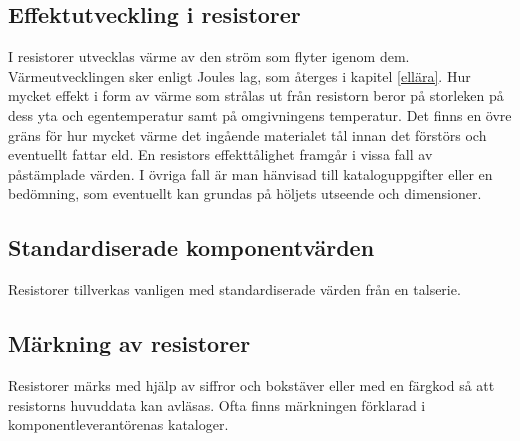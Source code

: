\subsection{Effektutveckling i resistorer}

I resistorer utvecklas värme av den ström som flyter igenom dem. Värmeutvecklingen
sker enligt Joules lag, som återges i kapitel \ref{ellära}. Hur mycket effekt i form av
värme som strålas ut från resistorn beror på storleken på dess yta och
egentemperatur samt på omgivningens temperatur. Det finns en övre gräns för hur
mycket värme det ingående materialet tål innan det förstörs och eventuellt fattar
eld. En resistors effekttålighet framgår i vissa fall av påstämplade värden.
I övriga fall är man hänvisad till kataloguppgifter eller en bedömning, som
eventuellt kan grundas på höljets utseende och dimensioner.

\subsection{Standardiserade komponentvärden}

Resistorer tillverkas vanligen med standardiserade värden från en talserie.

\subsection{Märkning av resistorer}

Resistorer märks med hjälp av siffror och bokstäver eller med en färgkod så att
resistorns huvuddata kan avläsas. Ofta finns märkningen förklarad i 
komponentleverantörenas kataloger.
